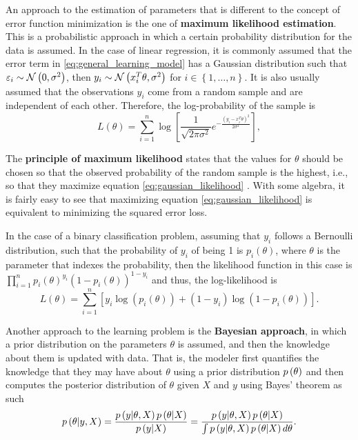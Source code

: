 An approach to the estimation of parameters that is different to the concept of error function minimization is the one of \textbf{maximum likelihood estimation}.
This is a probabilistic approach in which a certain probability distribution for the data is assumed.
In the case of linear regression, it is commonly assumed that the error term in \eqref{eq:general_learning_model} has a Gaussian distribution such that $\varepsilon_i \sim \mathcal{N}\left( 0, \sigma^2 \right)$, then $y_i \sim \mathcal{N}\left( x_i^T \theta, \sigma^2 \right)$ for $i \in \left\{ 1, \ldots, n \right\}$. It is also usually assumed that the observations $y_i$ come from a random sample and are independent of each other. Therefore, the log-probability of the sample is
\begin{equation}
  \label{eq:gaussian_likelihood}
  L(\theta) = \sum_{i = 1}^n \log \left[ \frac{1}{\sqrt{2 \pi \sigma^2}} e^{- \frac{(y_i - x_i^T \theta)^2}{2\sigma^2}} \right],
\end{equation}

The \textbf{principle of maximum likelihood} states that the values for $\theta$ should be chosen so that the observed probability of the random sample is the highest, i.e., so that they maximize equation \eqref{eq:gaussian_likelihood} \cite[p.~31]{friedman2001elements} \cite[p.~303]{roussas1973first}.
With some algebra, it is fairly easy to see that maximizing equation \eqref{eq:gaussian_likelihood} is equivalent to minimizing the squared error loss.

In the case of a binary classification problem, assuming that $y_i$ follows a Bernoulli distribution, such that the probability of $y_i$ of being 1 is $p_i(\theta)$, where $\theta$ is the parameter that indexes the probability, then the likelihood function in this case is $\prod_{i = 1}^n  p_i(\theta)^{y_i}\left(1 - p_i(\theta) \right)^{1 - y_i}$ and thus, the log-likelihood is
\begin{equation}
  L(\theta) = \sum_{i = 1}^n \left[ y_i \log\left( p_i(\theta) \right) + (1 - y_i) \log \left( 1 - p_i(\theta) \right) \right].
\end{equation}

Another approach to the learning problem is the \textbf{Bayesian approach}, in which a prior distribution on the parameters $\theta$ is assumed, and then the knowledge about them is updated with data. That is, the modeler first quantifies the knowledge that they may have about $\theta$ using a prior distribution $p\left( \theta \right)$ and then computes the posterior distribution of $\theta$ given $X$ and $y$ using Bayes' theorem as such
\begin{equation}
  \label{eq:bayes_theorem}
  p\left( \theta | y, X  \right) = \frac{p\left( y | \theta, X \right) p\left( \theta | X \right)}{p\left( y | X \right)} = \frac{p\left( y | \theta, X \right) p\left( \theta | X \right)}{\int p\left( y | \theta, X \right) p\left( \theta | X \right) d\theta}.
\end{equation}

